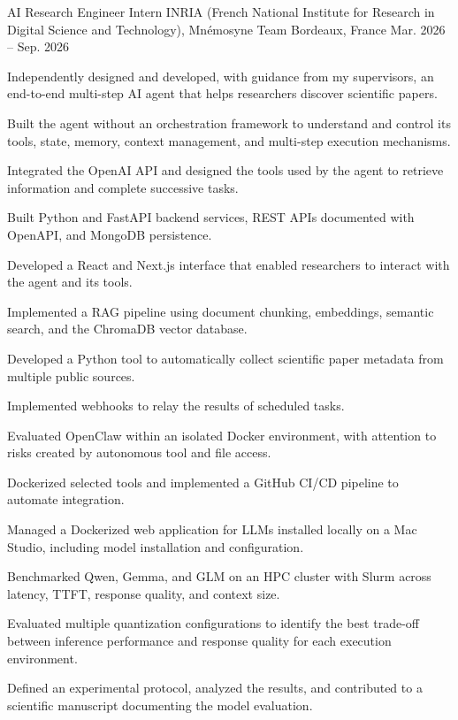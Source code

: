 
\begin{cventries}
  \cventry
    {AI Research Engineer Intern}
    {INRIA (French National Institute for Research in Digital Science and Technology), Mnémosyne Team}
    {Bordeaux, France}
    {Mar. 2026 -- Sep. 2026}
    {
      \begin{cvitems}
        \item {Independently designed and developed, with guidance from my supervisors, an end-to-end multi-step AI agent that helps researchers discover scientific papers.}
        \item {Built the agent without an orchestration framework to understand and control its tools, state, memory, context management, and multi-step execution mechanisms.}
        \item {Integrated the OpenAI API and designed the tools used by the agent to retrieve information and complete successive tasks.}
        \item {Built Python and FastAPI backend services, REST APIs documented with OpenAPI, and MongoDB persistence.}
        \item {Developed a React and Next.js interface that enabled researchers to interact with the agent and its tools.}
        \item {Implemented a RAG pipeline using document chunking, embeddings, semantic search, and the ChromaDB vector database.}
        \item {Developed a Python tool to automatically collect scientific paper metadata from multiple public sources.}
        \item {Implemented webhooks to relay the results of scheduled tasks.}
        \item {Evaluated OpenClaw within an isolated Docker environment, with attention to risks created by autonomous tool and file access.}
        \item {Dockerized selected tools and implemented a GitHub CI/CD pipeline to automate integration.}
        \item {Managed a Dockerized web application for LLMs installed locally on a Mac Studio, including model installation and configuration.}
        \item {Benchmarked Qwen, Gemma, and GLM on an HPC cluster with Slurm across latency, TTFT, response quality, and context size.}
        \item {Evaluated multiple quantization configurations to identify the best trade-off between inference performance and response quality for each execution environment.}
        \item {Defined an experimental protocol, analyzed the results, and contributed to a scientific manuscript documenting the model evaluation.}
      \end{cvitems}
    }


\end{cventries}
